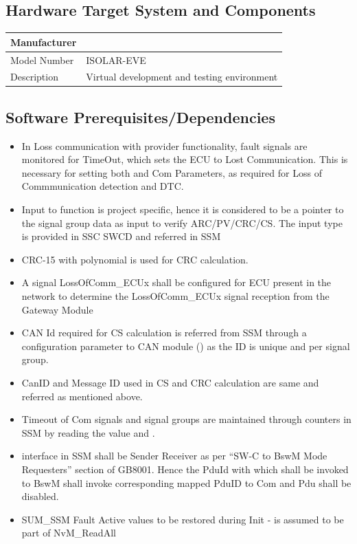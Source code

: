 \subsection{Hardware Target System and Components}
\begin{tabular}{ |l|l| }
	\hline
	{\bfseries Manufacturer} & {\bfseries}\\ \hline
	Model Number & ISOLAR-EVE\\ \hline
	Description & Virtual development and testing environment\\ \hline
\end{tabular}

\subsection{Software Prerequisites/Dependencies}
\begin{itemize}
\item In Loss communication with provider functionality, fault signals are monitored for TimeOut, which sets the ECU to Lost Communication. This is necessary for setting both  and  Com Parameters, as required for Loss of Commmunication detection and DTC. 
\item Input to function  is project specific, hence it is considered to be a pointer to the signal group data as input to verify ARC/PV/CRC/CS. The input type is provided in SSC SWCD and referred in SSM
\item CRC-15 with polynomial  is used for CRC calculation.
\item A signal LossOfComm\_ECUx shall be configured for ECU present in the network to determine the LossOfComm\_ECUx signal reception from the Gateway Module
\item CAN Id required for CS calculation is referred from SSM through a configuration parameter to CAN module () as the ID is unique and per signal group.
\item CanID and Message ID used in CS and CRC calculation are same and referred as mentioned above.
\item Timeout of Com signals and signal groups are maintained through counters in SSM by reading the  value and .
\item {} interface in SSM shall be Sender Receiver as per “SW-C to BswM Mode Requesters” section of GB8001. Hence the PduId with which  shall be invoked to BswM shall invoke corresponding mapped PduID to Com and Pdu shall be disabled.
\item SUM\_SSM Fault Active values to be restored during Init - is assumed to be part of NvM\_ReadAll
\end{itemize}

